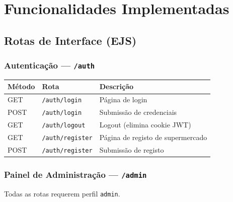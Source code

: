 \documentclass[12pt,a4paper]{article}
\begin{document}
\section{Funcionalidades Implementadas}

\subsection{Rotas de Interface (EJS)}

\subsubsection{Autenticação --- \texttt{/auth}}

\begin{center}
\begin{tabular}{lll}
\toprule
\textbf{Método} & \textbf{Rota} & \textbf{Descrição} \\
\midrule
GET  & \texttt{/auth/login}    & Página de login \\
POST & \texttt{/auth/login}    & Submissão de credenciais \\
GET  & \texttt{/auth/logout}   & Logout (elimina cookie JWT) \\
GET  & \texttt{/auth/register} & Página de registo de supermercado \\
POST & \texttt{/auth/register} & Submissão de registo \\
\bottomrule
\end{tabular}
\end{center}

\subsubsection{Painel de Administração --- \texttt{/admin}}

Todas as rotas requerem perfil \texttt{admin}.
\end{document}
